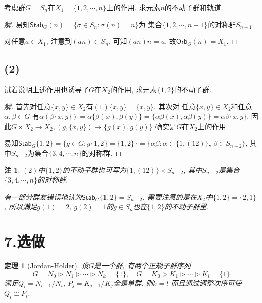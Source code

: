 \documentclass[12pt, a4paper, fontset=windows]{ctexart}
\newcommand{\Orb}{\mathsf{Orb}}
\newcommand{\Stab}{\mathsf{Stab}}
\newcommand{\isom}{\cong} %
\newcommand{\xuan}{{\normalsize 选做}}
\newtheorem*{remark}{注}
\newtheorem*{theorem}{定理}
\newenvironment{solution}{\begin{proof}[解]}{\end{proof}}
\begin{document}
考虑群$G=S_n$在$X_1=\{1,2,\cdots,n\}$上的作用. 求元素$n$的不动子群和轨道. 

\begin{solution}
易知$\Stab_G(n)=\{\sigma\in S_n:\sigma(n)=n\}$为
集合$\{1,2,\cdots,n-1\}$的对称群$S_{n-1}$. 

对任意$a\in X_1$, 注意到$(an)\in S_n$, 
可知$(an)n=a$, 故$\Orb_G(n)=X_1$. 
\end{solution}

\subsection*{(2)}

试着说明上述作用也诱导了$G$在$X_2$的作用, 求元素$\{1,2\}$的不动子群. 

\begin{solution}
首先对任意$\{x,y\}\in X_2$有$(1)\{x,y\}=\{x,y\}$. 其次对
任意$\{x,y\}\in X_2$和任意$\alpha,\beta\in G$
有$\alpha(\beta\{x,y\})=\alpha\{\beta(x),\beta(y)\}
=\{\alpha\beta(x),\alpha\beta(y)\}=\alpha\beta\{x,y\}$. 
因此$G\times X_2\to X_2,(g,\{x,y\})\mapsto\{g(x),g(y)\}$
确实是$G$在$X_2$上的作用. 

易知$\Stab_G\{1,2\}=\{g\in G:g\{1,2\}=\{1,2\}\}
=\{\alpha\beta:\alpha\in\{1,(12)\}$, $\beta\in S_{n-2}\}$, 
其中$S_{n-2}$为集合$\{3,4,\cdots,n\}$的对称群. 
\end{solution}

\begin{remark}
$(2)$中$\{1,2\}$的不动子群也可写为$\{1,(12)\}\times S_{n-2}$, 
其中$S_{n-2}$是集合$\{3,4,\cdots,n\}$的对称群. 

有一部分群友错误地认为$\Stab_G{\{1,2\}}=S_{n-2}$. 
需要注意的是在$X_2$中$\{1,2\}=\{2,1\}$, 所以满足$g(1)=2$, 
$g(2)=1$的$g\in S_n$也在$\{1,2\}$的不动子群里. 
\end{remark}

\section*{7.\xuan}

\begin{theorem}[Jordan-Holder]
设$G$是一个群, 有两个正规子群序列
\[G=N_0\rhd N_1\rhd\cdots\rhd N_k=\{1\},\quad G=K_0\rhd K_1\rhd\cdots\rhd K_l=\{1\}\]
满足$Q_i=N_{i-1}/N_i$, $P_j=K_{j-1}/K_j$全是单群. 则$k=l$
而且通过调整次序可使$Q_i\isom P_i$. 
\end{theorem}
\end{document}
